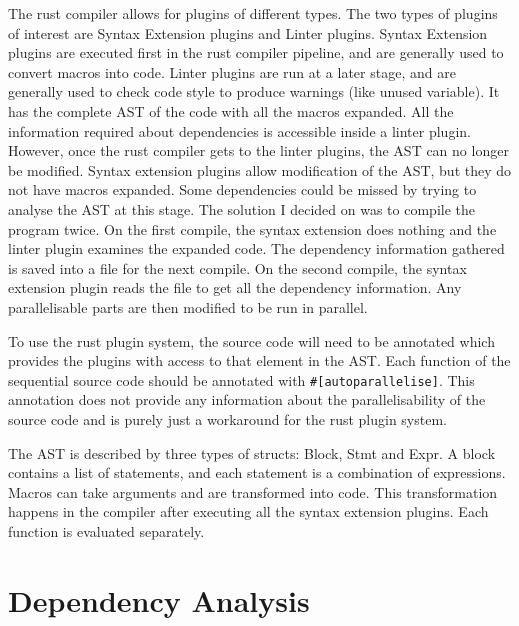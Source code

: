The rust compiler allows for plugins of different types. The two types of plugins of interest are Syntax Extension plugins and Linter plugins. Syntax Extension plugins are executed first in the rust compiler pipeline, and are generally used to convert macros into code. Linter plugins are run at a later stage, and are generally used to check code style to produce warnings (like unused variable). It has the complete AST of the code with all the macros expanded. All the information required about dependencies is accessible inside a linter plugin. However, once the rust compiler gets to the linter plugins, the AST can no longer be modified. Syntax extension plugins allow modification of the AST, but they do not have macros expanded. Some dependencies could be missed by trying to analyse the AST at this stage. The solution I decided on was to compile the program twice. On the first compile, the syntax extension does nothing and the linter plugin examines the expanded code. The dependency information gathered is saved into a file for the next compile. On the second compile, the syntax extension plugin reads the file to get all the dependency information. Any parallelisable parts are then modified to be run in parallel.

To use the rust plugin system, the source code will need to be annotated which provides the plugins with access to that element in the AST. Each function of the sequential source code should be annotated with \texttt{\#[autoparallelise]}. This annotation does not provide any information about the parallelisability of the source code and is purely just a workaround for the rust plugin system.

 The AST is described by three types of structs: Block, Stmt and Expr. A block contains a list of statements, and each statement is a combination of expressions. Macros can take arguments and are transformed into code. This transformation happens in the compiler after executing all the syntax extension plugins. Each function is evaluated separately.

\section{Dependency Analysis}

